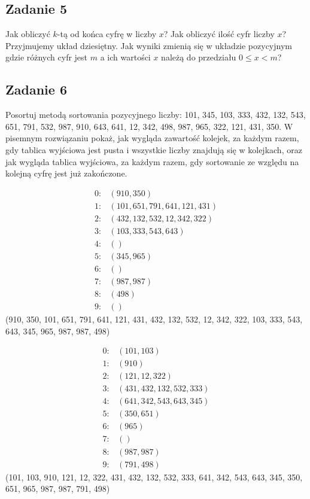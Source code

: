 \documentclass{article}
\begin{document}
\subsection*{Zadanie 5}
Jak obliczyć $k$-tą od końca cyfrę w liczby $x$? Jak obliczyć ilość cyfr liczby $x$? Przyjmujemy
układ dziesiętny. Jak wyniki zmienią się w układzie pozycyjnym gdzie różnych cyfr jest $m$ a ich
wartości $x$ należą do przedziału $0 \leq x < m$?

\pagebreak
\subsection*{Zadanie 6}
Posortuj metodą sortowania pozycyjnego liczby: 101, 345, 103, 333, 432, 132, 543, 651,
791, 532, 987, 910, 643, 641, 12, 342, 498, 987, 965, 322, 121, 431, 350. W pisemnym
rozwiązaniu pokaż, jak wygląda zawartość kolejek, za każdym razem, gdy tablica
wyjściowa jest pusta i wszystkie liczby znajdują się w kolejkach, oraz jak wygląda
tablica wyjściowa, za każdym razem, gdy sortowanie ze względu na kolejną cyfrę jest już zakończone.

\begin{align*}
    0: & \left(910, 350\right) \\
    1: & \left(101, 651, 791, 641, 121, 431\right) \\
    2: & \left(432, 132, 532, 12, 342, 322\right) \\
    3: & \left(103, 333, 543, 643\right) \\
    4: & \left(\right) \\
    5: & \left(345, 965\right) \\
    6: & \left(\right) \\
    7: & \left(987, 987\right) \\
    8: & \left(498\right) \\
    9: & \left(\right)
\end{align*}
(910, 350, 101, 651, 791, 641, 121, 431, 432, 132, 532, 12, 342, 322, 103, 333, 543, 643, 345, 965, 987, 987, 498)

\begin{align*}
    0: & \left(101, 103\right) \\
    1: & \left(910\right) \\
    2: & \left(121, 12, 322\right) \\
    3: & \left(431, 432, 132, 532, 333\right) \\
    4: & \left(641, 342, 543, 643, 345\right) \\
    5: & \left(350, 651\right) \\
    6: & \left(965\right) \\
    7: & \left(\right) \\
    8: & \left(987, 987\right) \\
    9: & \left(791, 498\right)
\end{align*}
(101, 103, 910, 121, 12, 322, 431, 432, 132, 532, 333, 641, 342, 543, 643, 345, 350, 651, 965, 987, 987, 791, 498)
\end{document}
